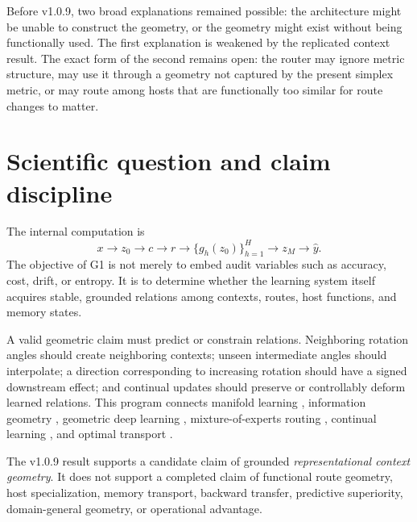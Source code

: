 \documentclass[11pt,a4paper]{article}
\begin{document}
Before v1.0.9, two broad explanations remained possible: the architecture might be unable to construct the geometry, or the geometry might exist without being functionally used. The first explanation is weakened by the replicated context result. The exact form of the second remains open: the router may ignore metric structure, may use it through a geometry not captured by the present simplex metric, or may route among hosts that are functionally too similar for route changes to matter.

\section{Scientific question and claim discipline}

The internal computation is
\begin{equation}
 x \longrightarrow z_0 \longrightarrow c \longrightarrow r
 \longrightarrow \{g_h(z_0)\}_{h=1}^{H}
 \longrightarrow z_M \longrightarrow \hat y.
\end{equation}
The objective of G1 is not merely to embed audit variables such as accuracy, cost, drift, or entropy. It is to determine whether the learning system itself acquires stable, grounded relations among contexts, routes, host functions, and memory states.

A valid geometric claim must predict or constrain relations. Neighboring rotation angles should create neighboring contexts; unseen intermediate angles should interpolate; a direction corresponding to increasing rotation should have a signed downstream effect; and continual updates should preserve or controllably deform learned relations. This program connects manifold learning \parencite{tenenbaum2000isomap,roweis2000lle}, information geometry \parencite{amari1998natural}, geometric deep learning \parencite{bronstein2021geometric}, mixture-of-experts routing \parencite{shazeer2017moe,fedus2022switch}, continual learning \parencite{parisi2019continual,kirkpatrick2017ewc}, and optimal transport \parencite{peyre2019ot,cuturi2013sinkhorn}.

\begin{criticalbox}
The v1.0.9 result supports a candidate claim of grounded \emph{representational context geometry}. It does not support a completed claim of functional route geometry, host specialization, memory transport, backward transfer, predictive superiority, domain-general geometry, or operational advantage.
\end{criticalbox}
\end{document}
